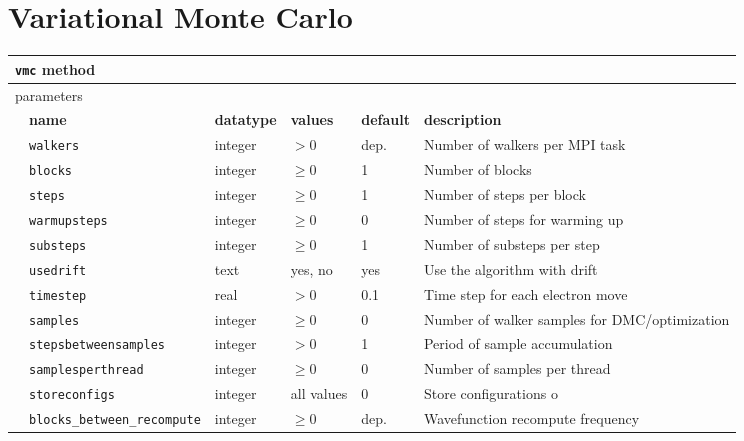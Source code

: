 \section{Variational Monte Carlo}
\label{sec:vmc}

\begin{table}[h]
\begin{tabularx}{\textwidth}{l l l l l X }
\hline
\multicolumn{6}{l}{\texttt{vmc} method} \\
\hline
\multicolumn{2}{l}{parameters}  & \multicolumn{4}{l}{}\\
   &   \bfseries name     & \bfseries datatype & \bfseries values & \bfseries default   & \bfseries description \\
   &   \texttt{walkers             } &  integer  & $> 0$   & dep.& Number of walkers per MPI task  \\
   &   \texttt{blocks              } &  integer  & $\ge 0$ & 1   & Number of blocks            \\
   &   \texttt{steps               } &  integer  & $\ge 0$ & 1   & Number of steps per block   \\
   &   \texttt{warmupsteps         } &  integer  & $\ge 0$ & 0   & Number of steps for warming up\\
   &   \texttt{substeps            } &  integer  & $\ge 0$ & 1   & Number of substeps per step \\
   &   \texttt{usedrift            } &  text     & yes, no & yes  & Use the algorithm with drift\\
   &   \texttt{timestep            } &  real     & $> 0$   & 0.1 & Time step for each electron move \\
   &   \texttt{samples             } &  integer  & $\ge 0$ & 0   & Number of walker samples for DMC/optimization\\
   &   \texttt{stepsbetweensamples } &  integer  & $> 0$   & 1   & Period of sample accumulation\\
   &   \texttt{samplesperthread    } &  integer  & $\ge 0$ & 0   & Number of samples per thread  \\
   &   \texttt{storeconfigs        } &  integer  & all values & 0   & Store configurations o  \\
   &   \texttt{blocks\_between\_recompute} &  integer  & $\ge 0$ & dep.  & Wavefunction recompute frequency  \\
  \hline
\end{tabularx}
\end{table}

